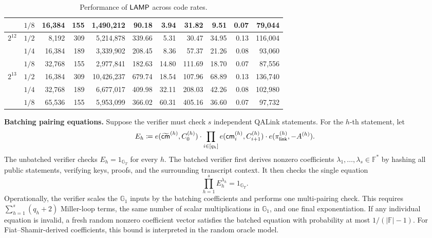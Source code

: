 \begin{table}[!t]
\begin{revblock}[unbreakable]
\begin{tabular*}{\linewidth}{@{\extracolsep{\fill}}ccrrrrrrrrr@{}}
& \(1/8\) & 16{,}384 & 155 & 1{,}490{,}212 & 90.18 & 3.94 & 31.82 & 9.51 & 0.07 & 79{,}044 \\
\midrule
\multirow{3}{*}{\(2^{12}\)}
& \(1/2\) & 8{,}192 & 309 & 5{,}214{,}878 & 339.66 & 5.31 & 30.47 & 34.95 & 0.13 & 116{,}004 \\
& \(1/4\) & 16{,}384 & 189 & 3{,}339{,}902 & 208.45 & 8.36 & 57.37 & 21.26 & 0.08 & 93{,}060 \\
& \(1/8\) & 32{,}768 & 155 & 2{,}977{,}841 & 182.63 & 14.80 & 111.69 & 18.70 & 0.07 & 87{,}556 \\
\midrule
\multirow{3}{*}{\(2^{13}\)}
& \(1/2\) & 16{,}384 & 309 & 10{,}426{,}237 & 679.74 & 18.54 & 107.96 & 68.89 & 0.13 & 136{,}740 \\
& \(1/4\) & 32{,}768 & 189 & 6{,}677{,}017 & 409.98 & 32.11 & 208.03 & 42.26 & 0.08 & 102{,}980 \\
& \(1/8\) & 65{,}536 & 155 & 5{,}953{,}099 & 366.02 & 60.31 & 405.16 & 36.60 & 0.07 & 97{,}732 \\
\bottomrule
\end{tabular*}
\end{revblock}
\vspace{6pt}
\caption{Performance of \(\textsf{LAMP}\) across code rates.}
\label{tab:lamp-code-rates}
\end{table}

\noindent\textbf{Batching pairing equations.}
Suppose the verifier must check \(s\) independent QALink statements.  For the
\(h\)-th statement, let
\[
  E_h
  \coloneqq
  e(\widetilde{\textsf{cm}}^{(h)},C^{(h)}_0)
  \cdot
  \prod_{i\in[q_h]} e(\textsf{cm}^{(h)}_i,C^{(h)}_{i+1})
  \cdot
  e(\pi^{(h)}_{\mathsf{link}},-A^{(h)}).
\]
The unbatched verifier checks \(E_h=1_{\mathbb{G}_T}\) for every \(h\).  The
batched verifier first derives nonzero coefficients
\(\lambda_1,\ldots,\lambda_s\in\mathbb{F}^{\ast}\) by hashing all public
statements, verifying keys, proofs, and the surrounding transcript context.  It
then checks the single equation
\[
  \prod_{h=1}^{s} E_h^{\lambda_h}=1_{\mathbb{G}_T}.
\]
Operationally, the verifier scales the \(\mathbb{G}_1\) inputs by the batching
coefficients and performs one multi-pairing check.  This requires
\(\sum_{h=1}^{s}(q_h+2)\) Miller-loop terms, the same number of scalar
multiplications in \(\mathbb{G}_1\), and one final exponentiation.  If any
individual equation is invalid, a fresh random nonzero coefficient vector
satisfies the batched equation with probability at most
\(1/(|\mathbb{F}|-1)\).  For Fiat--Shamir-derived coefficients, this bound is
interpreted in the random oracle model.


